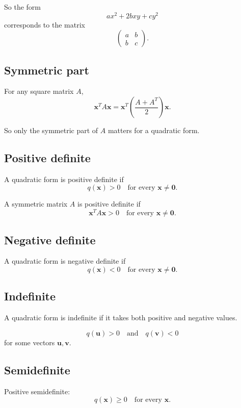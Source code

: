 So the form
\[
    ax^2+2bxy+cy^2
\]
corresponds to the matrix
\[
\boxed{
    \begin{pmatrix}
    a&b\\
    b&c
    \end{pmatrix}.
}
\]

\subsection*{Symmetric part}

For any square matrix \(A\),
\[
\boxed{
    \mathbf x^T A\mathbf x
    =
    \mathbf x^T\left(\frac{A+A^T}{2}\right)\mathbf x.
}
\]

So only the symmetric part of \(A\) matters for a quadratic form.

\subsection*{Positive definite}

A quadratic form is positive definite if
\[
\boxed{
    q(\mathbf x)>0
    \quad\text{for every }\mathbf x\ne\mathbf 0.
}
\]

A symmetric matrix \(A\) is positive definite if
\[
\boxed{
    \mathbf x^T A\mathbf x>0
    \quad\text{for every }\mathbf x\ne\mathbf 0.
}
\]

\subsection*{Negative definite}

A quadratic form is negative definite if
\[
\boxed{
    q(\mathbf x)<0
    \quad\text{for every }\mathbf x\ne\mathbf 0.
}
\]

\subsection*{Indefinite}

A quadratic form is indefinite if it takes both positive and negative values.

\[
\boxed{
    q(\mathbf u)>0
    \quad\text{and}\quad
    q(\mathbf v)<0
}
\]
for some vectors \(\mathbf u,\mathbf v\).

\subsection*{Semidefinite}

Positive semidefinite:
\[
\boxed{
    q(\mathbf x)\ge0
    \quad\text{for every }\mathbf x.
}
\]

